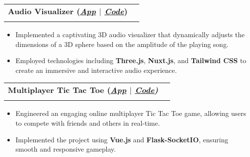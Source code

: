 \documentclass[a4paper,10pt]{article}
\makeatletter
\newcommand{\resumeSubheading}[4]{
  \vspace{-1pt}\item
    \begin{tabular*}{0.97\textwidth}[t]{l@{\extracolsep{\fill}}r}
      \textbf{#1} & #2 \\
      \textit{\normalsize#3} & \textit{\normalsize #4} \\
    \end{tabular*}\vspace{-7pt}
}
\makeatother
\begin{document}
\resumeSubheading
{Audio Visualizer (\textit{\href{https://audio-visualizer-threejs.netlify.app/}{\textbf{\underline{App}}} $|$ \href{https://github.com/AnkushSarkar10/audio_vis_threejs}{\textbf{\underline{Code}}}})}{}{}{}
\vspace{-15pt}
\begin{itemize}
  \item Implemented a captivating 3D audio visualizer that dynamically adjusts the dimensions of a 3D sphere based on the amplitude of the playing song.
  \item Employed technologies including \textbf{Three.js}, \textbf{Nuxt.js}, and \textbf{Tailwind CSS} to create an immersive and interactive audio experience.
\end{itemize}
\vspace{-5pt}

\resumeSubheading
{Multiplayer Tic Tac Toe (\textit{\href{https://vue-flask-tic-tac-toe.web.app/}{\textbf{\underline{App}}} $|$ \href{https://github.com/AnkushSarkar10/vue-flask-tic-tac-toe}{\textbf{\underline{Code}}})}}{}{}{}
\vspace{-15pt}
\begin{itemize}
  \item Engineered an engaging online multiplayer Tic Tac Toe game, allowing users to compete with friends and others in real-time.
  \item Implemented the project using \textbf{Vue.js} and \textbf{Flask-SocketIO}, ensuring smooth and responsive gameplay.
\end{itemize}
\vspace{-5pt}


\end{document}
